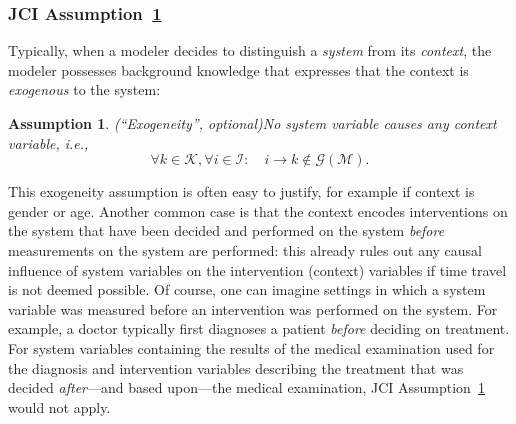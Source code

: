 \documentclass[twoside,11pt]{article}
\newcommand\C[1]{\mathcal{#1}}
\newtheorem{assumption}{Assumption}
\newcommand{\Sara}[1]{{\color{purple}#1}}
\begin{document}
\subsubsection{JCI Assumption~\ref{ass:uncaused}}
Typically, when a modeler decides to distinguish a \emph{system} from its \emph{context}, the modeler possesses
background knowledge that expresses that the context is \emph{exogenous} to the system:
\begin{assumption}(``Exogeneity'', optional)\label{ass:uncaused}
  No system variable causes any context variable, i.e.,
$$\forall k \in \C{K}, \forall i\in\C{I}: \quad i \to k \notin \C{G}(\C{M}).$$
\end{assumption}
This exogeneity assumption is often easy to justify, for example if context is gender or age. 
Another common case is that the context encodes interventions
on the system that have been decided and performed on the system \emph{before} measurements on the system are performed: this already rules out any causal influence of system variables on the intervention (context) variables if time travel is not deemed possible. Of course, one can imagine settings in which a system variable was measured before an
intervention was performed on the system. For example, a doctor typically first diagnoses a patient 
\emph{before} deciding on treatment. For system variables containing the results of the medical examination
used for the diagnosis and intervention variables describing the treatment that was decided \emph{after}---and based upon---the
medical examination, JCI Assumption~\ref{ass:uncaused} would not apply.
\end{document}
